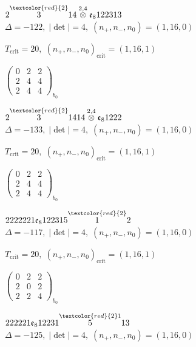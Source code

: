 \documentclass[10pt]{article}
\begin{document}
\smallskip

$2\overset{\textcolor{red}{2}}{3}14\overset{2,4}{\otimes}\mathfrak{e}_8122313$ \quad $\Delta=-122,\; |\det|=4,\; (n_+,n_-,n_0)=(1,16,0)$

\hspace{1em}$T_{\text{crit}}=20,\; (n_+,n_-,n_0)_{\text{crit}}=(1,16,1)$

\hspace{2em}$\left(\begin{smallmatrix}0 & 2 & 2 \\ 2 & 4 & 4 \\ 2 & 4 & 4\end{smallmatrix}\right)_{\!b_0}$

\smallskip

$2\overset{\textcolor{red}{2}}{3}1414\overset{2,4}{\otimes}\mathfrak{e}_81222$ \quad $\Delta=-133,\; |\det|=4,\; (n_+,n_-,n_0)=(1,16,0)$

\hspace{1em}$T_{\text{crit}}=20,\; (n_+,n_-,n_0)_{\text{crit}}=(1,16,1)$

\hspace{2em}$\left(\begin{smallmatrix}0 & 2 & 2 \\ 2 & 4 & 4 \\ 2 & 4 & 4\end{smallmatrix}\right)_{\!b_0}$

\smallskip

$2222221\mathfrak{e}_8122315\overset{\textcolor{red}{2}}{1}2$ \quad $\Delta=-117,\; |\det|=4,\; (n_+,n_-,n_0)=(1,16,0)$

\hspace{1em}$T_{\text{crit}}=20,\; (n_+,n_-,n_0)_{\text{crit}}=(1,16,1)$

\hspace{2em}$\left(\begin{smallmatrix}0 & 2 & 2 \\ 2 & 0 & 2 \\ 2 & 2 & 4\end{smallmatrix}\right)_{\!b_0}$

\smallskip

$222221\mathfrak{e}_812231\overset{\textcolor{red}{2}1}{5}13$ \quad $\Delta=-125,\; |\det|=4,\; (n_+,n_-,n_0)=(1,16,0)$
\end{document}
